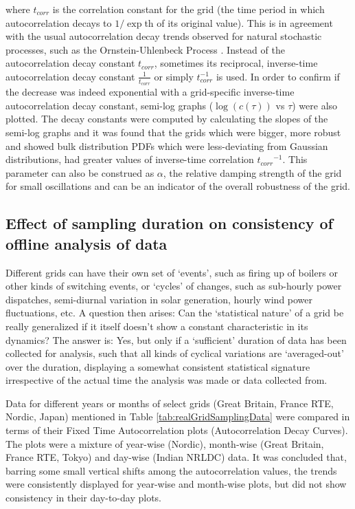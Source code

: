 where $t_{corr}$ is the correlation constant for the grid (the time period in which autocorrelation decays to $1/\exp$th of its original value). This is in agreement with the usual autocorrelation decay trends observed for natural stochastic processes, such as the Ornstein-Uhlenbeck Process \cite{numericalSolutionForStochasticDifferentailEquationsKloedenEckhard}. 
Instead of the autocorrelation decay constant $t_{corr}$, sometimes its reciprocal, inverse-time autocorrelation decay constant $\frac{1}{t_{corr}}$ or simply $t_{corr}^{-1}$ is used.   
In order to confirm if the decrease was indeed exponential with a grid-specific inverse-time autocorrelation decay constant, semi-log graphs ($\log(c(\tau))$ vs $\tau$) were also plotted. The decay constants were computed by calculating the slopes of the semi-log graphs and it was found that the grids which were bigger, more robust and showed bulk distribution PDFs which were less-deviating from Gaussian distributions, had greater values of inverse-time correlation ${t_{corr}}^{-1}$. This parameter can also be construed as $\alpha$, the relative damping strength of the grid for small oscillations and can be an indicator of the overall robustness of the grid.	

\subsection*{Effect of sampling duration on consistency of offline analysis of data}
\label{app:effectOfSamplingDuration}

Different grids can have their own set of `events', such as firing up of boilers or other kinds of switching events, or `cycles' of changes, such as sub-hourly power dispatches, semi-diurnal variation in solar generation, hourly wind power fluctuations, etc. A question then arises: Can the `statistical nature' of a grid be really generalized if it itself doesn't show a constant characteristic in its dynamics? The answer is: Yes, but only if a `sufficient' duration of data has been collected for analysis, such that all kinds of cyclical variations are `averaged-out' over the duration, displaying a somewhat consistent statistical signature irrespective of the actual time the analysis was made or data collected from.

Data for different years or months of select grids (Great Britain, France RTE, Nordic, Japan) mentioned in Table \ref{tab:realGridSamplingData} were compared in terms of their Fixed Time Autocorrelation plots (Autocorrelation Decay Curves). The plots were a mixture of year-wise (Nordic), month-wise (Great Britain, France RTE, Tokyo) and day-wise (Indian NRLDC) data. It was concluded that, barring some small vertical shifts among the autocorrelation values, the trends were consistently displayed for year-wise and month-wise plots, but did not show consistency in their day-to-day plots. 

